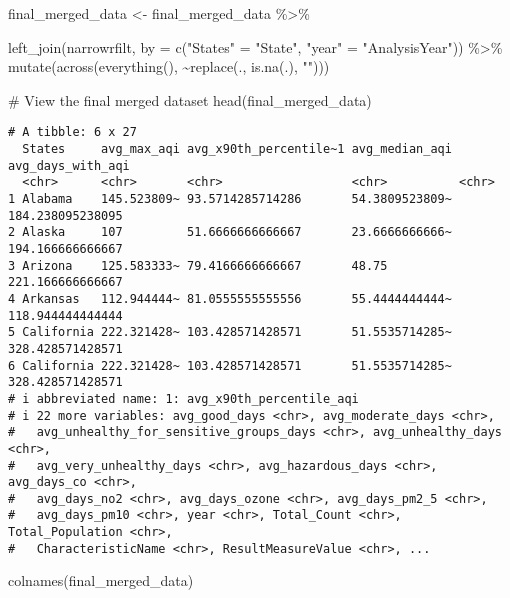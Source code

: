\documentclass[
  12pt,
]{article}
\newenvironment{Shaded}{\begin{snugshade}}{\end{snugshade}}
\newcommand{\AttributeTok}[1]{\textcolor[rgb]{0.40,0.45,0.13}{#1}}
\newcommand{\CommentTok}[1]{\textcolor[rgb]{0.37,0.37,0.37}{#1}}
\newcommand{\FunctionTok}[1]{\textcolor[rgb]{0.28,0.35,0.67}{#1}}
\newcommand{\NormalTok}[1]{\textcolor[rgb]{0.00,0.23,0.31}{#1}}
\newcommand{\OtherTok}[1]{\textcolor[rgb]{0.00,0.23,0.31}{#1}}
\newcommand{\SpecialCharTok}[1]{\textcolor[rgb]{0.37,0.37,0.37}{#1}}
\newcommand{\StringTok}[1]{\textcolor[rgb]{0.13,0.47,0.30}{#1}}
\begin{document}
\begin{Shaded}
\begin{Highlighting}[]
\NormalTok{final\_merged\_data }\OtherTok{\textless{}{-}}\NormalTok{ final\_merged\_data }\SpecialCharTok{\%\textgreater{}\%}
  
  \FunctionTok{left\_join}\NormalTok{(narrowrfilt, }\AttributeTok{by =} \FunctionTok{c}\NormalTok{(}\StringTok{"States"} \OtherTok{=} \StringTok{"State"}\NormalTok{, }\StringTok{"year"} \OtherTok{=} \StringTok{"AnalysisYear"}\NormalTok{)) }\SpecialCharTok{\%\textgreater{}\%}
  \FunctionTok{mutate}\NormalTok{(}\FunctionTok{across}\NormalTok{(}\FunctionTok{everything}\NormalTok{(), }\SpecialCharTok{\textasciitilde{}}\FunctionTok{replace}\NormalTok{(., }\FunctionTok{is.na}\NormalTok{(.), }\StringTok{""}\NormalTok{)))}

\CommentTok{\# View the final merged dataset}
\FunctionTok{head}\NormalTok{(final\_merged\_data)}
\end{Highlighting}
\end{Shaded}

\begin{verbatim}
# A tibble: 6 x 27
  States     avg_max_aqi avg_x90th_percentile~1 avg_median_aqi avg_days_with_aqi
  <chr>      <chr>       <chr>                  <chr>          <chr>            
1 Alabama    145.523809~ 93.5714285714286       54.3809523809~ 184.238095238095 
2 Alaska     107         51.6666666666667       23.6666666666~ 194.166666666667 
3 Arizona    125.583333~ 79.4166666666667       48.75          221.166666666667 
4 Arkansas   112.944444~ 81.0555555555556       55.4444444444~ 118.944444444444 
5 California 222.321428~ 103.428571428571       51.5535714285~ 328.428571428571 
6 California 222.321428~ 103.428571428571       51.5535714285~ 328.428571428571 
# i abbreviated name: 1: avg_x90th_percentile_aqi
# i 22 more variables: avg_good_days <chr>, avg_moderate_days <chr>,
#   avg_unhealthy_for_sensitive_groups_days <chr>, avg_unhealthy_days <chr>,
#   avg_very_unhealthy_days <chr>, avg_hazardous_days <chr>, avg_days_co <chr>,
#   avg_days_no2 <chr>, avg_days_ozone <chr>, avg_days_pm2_5 <chr>,
#   avg_days_pm10 <chr>, year <chr>, Total_Count <chr>, Total_Population <chr>,
#   CharacteristicName <chr>, ResultMeasureValue <chr>, ...
\end{verbatim}

\begin{Shaded}
\begin{Highlighting}[]
\FunctionTok{colnames}\NormalTok{(final\_merged\_data)}
\end{Highlighting}
\end{Shaded}
\end{document}
